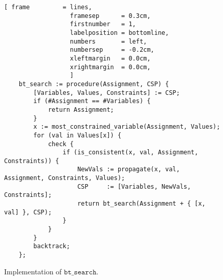\begin{figure}[!ht]
\centering
\begin{Verbatim}[ frame         = lines, 
                  framesep      = 0.3cm, 
                  firstnumber   = 1,
                  labelposition = bottomline,
                  numbers       = left,
                  numbersep     = -0.2cm,
                  xleftmargin   = 0.0cm,
                  xrightmargin  = 0.0cm,
                  ]
    bt_search := procedure(Assignment, CSP) {
        [Variables, Values, Constraints] := CSP;
        if (#Assignment == #Variables) {
            return Assignment;
        }
        x := most_constrained_variable(Assignment, Values);
        for (val in Values[x]) {
            check {
                if (is_consistent(x, val, Assignment, Constraints)) {
                    NewVals := propagate(x, val, Assignment, Constraints, Values);
                    CSP     := [Variables, NewVals, Constraints];
                    return bt_search(Assignment + { [x, val] }, CSP);
                }
            }
        }
        backtrack;
    };                  
\end{Verbatim}
\vspace*{-0.3cm}
\caption{Implementation of $\texttt{bt\_search}$.}
\label{fig:csp-constraint-propagation.stlx:bt_search}
\end{figure}

